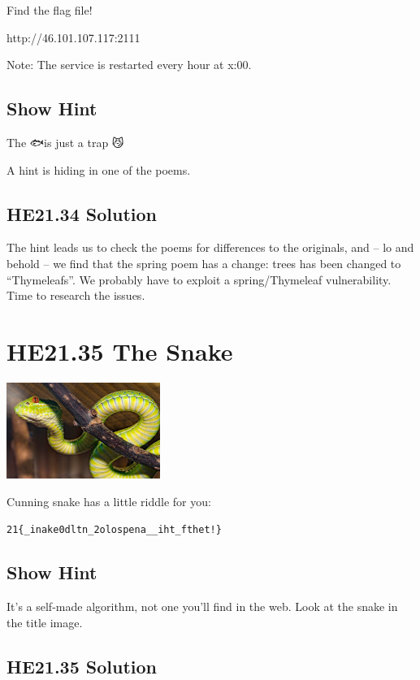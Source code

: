 \documentclass[english,a4paper,nols,noindent]{tufte-handout}
\begin{document}
Find the flag file!

http://46.101.107.117:2111

Note: The service is restarted every hour at x:00.
\subsection{Show Hint}
The 🐟is just a trap 😼

A hint is hiding in one of the poems.

\hypertarget{he21.34-solution}{%
\subsection{HE21.34 Solution}\label{he21.34-solution}}

\noindent The hint leads us to check the poems for differences to the
originals, and -- lo and behold -- we find that the spring poem has a
change: trees has been changed to ``Thymeleafs''.  We probably have to
exploit a spring/Thymeleaf vulnerability.  Time to research the
issues.


\hypertarget{he21.35}{%
\section{HE21.35 The Snake}
  \label{he21.35}}
\begin{marginfigure}
    \includegraphics[width=50mm]{images/challenge35.jpg}
\end{marginfigure}

\noindent Cunning snake has a little riddle for you:

\verb+21{_inake0dltn_2olospena__iht_fthet!}+

\subsection{Show Hint}
It's a self-made algorithm, not one you'll find in the web.
Look at the snake in the title image.


\hypertarget{he21.35-solution}{%
\subsection{HE21.35 Solution}\label{he21.35-solution}}
\end{document}
